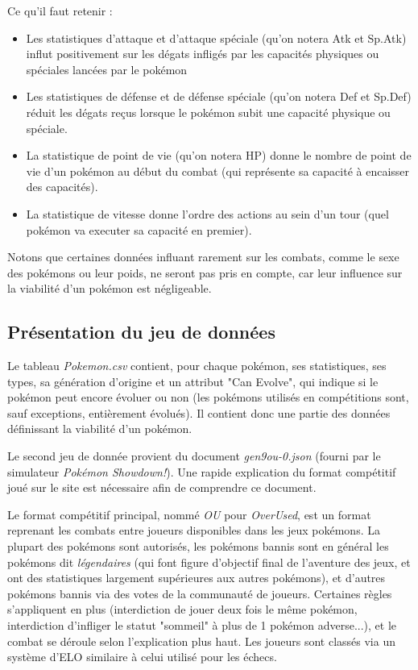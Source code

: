 \documentclass[a4paper,12pt]{article}
\begin{document}
Ce qu'il faut retenir :
\begin{itemize}
    \item Les statistiques d'attaque et d'attaque spéciale (qu'on notera Atk et
    Sp.Atk) influt positivement sur les dégats infligés par les capacités
    physiques ou spéciales lancées par le pokémon
    \item Les statistiques de défense et de défense spéciale (qu'on notera Def
    et Sp.Def) réduit les dégats reçus lorsque le pokémon subit une capacité
    physique ou spéciale.
    \item La statistique de point de vie (qu'on notera HP) donne le nombre de
    point de vie d'un pokémon au début du combat (qui représente sa capacité à
    encaisser des capacités).
    \item La statistique de vitesse donne l'ordre des actions au sein d'un tour
    (quel pokémon va executer sa capacité en premier).
\end{itemize}

Notons que certaines données influant rarement sur les combats, comme le sexe
des pokémons ou leur poids, ne seront pas pris en compte, car leur influence sur
la viabilité d'un pokémon est négligeable.

\subsection{Présentation du jeu de données}
Le tableau \textit{Pokemon.csv} contient, pour chaque pokémon, ses statistiques,
ses types, sa génération d'origine et un attribut "Can Evolve", qui indique si
le pokémon peut encore évoluer ou non (les pokémons utilisés en compétitions
sont, sauf exceptions, entièrement évolués). Il contient donc une partie des
données définissant la viabilité d'un pokémon.

Le second jeu de donnée provient du document \textit{gen9ou-0.json} (fourni par
le simulateur \textit{Pokémon Showdown!}). Une rapide explication du format
compétitif joué sur le site est nécessaire afin de comprendre ce document.

Le format compétitif principal, nommé \textit{OU} pour \textit{OverUsed}, est un
format reprenant les combats entre joueurs disponibles dans les jeux pokémons.
La plupart des pokémons sont autorisés, les pokémons bannis sont en général les
pokémons dit \textit{légendaires} (qui font figure d'objectif final de
l'aventure des jeux, et ont des statistiques largement supérieures aux autres
pokémons), et d'autres pokémons bannis via des votes de la communauté de
joueurs. Certaines règles s'appliquent en plus (interdiction de jouer deux fois
le même pokémon, interdiction d'infliger le statut "sommeil" à plus de 1 pokémon
adverse...), et le combat se déroule selon l'explication plus haut. Les joueurs
sont classés via un système d'ELO similaire à celui utilisé pour les échecs.
\end{document}
